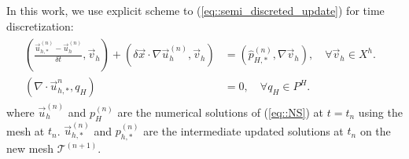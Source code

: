 \documentclass{eajam}
\begin{document}
\begin{enumerate}[step 1]
       In this work, we use explicit scheme to
       (\ref{eq::semi_discreted_update}) for time discretization:
       \begin{eqnarray}
         \begin{aligned}
           \left ( \frac{\vec{u}_{h, *}^{(n)} - \vec{u}_h^{(n)}}{\delta
               t},
           \vec{v}_h \right) + \left( \delta \vec{x} \cdot \nabla 
           \vec{u}_{h}^{(n)}, \vec{v}_h \right)  & =  \left( 
           \hat{p}_{H, *}^{(n)}, \nabla \vec{v}_h \right),  \quad
           \forall \vec{v}_h \in X^h. &\\
           \left( \nabla \cdot \vec{u}_{h, *}^{n}, q_H \right) & =  0, \quad
           \forall q_H \in P^H. &
         \end{aligned}
         \label{eq::full_discreted_update}
       \end{eqnarray}
       where $\vec{u}_h^{(n)}$ and $p_H^{(n)}$ are the numerical
       solutions of (\ref{eq::NS}) at $t = t_{n}$ using the mesh at
       $t_n$. $\vec{u}_{h,*}^{(n)}$ and $p_{h, *}^{(n)}$ are the
       intermediate updated solutions at $t_{n}$ on the new
       mesh $\mathcal{T}^{(n + 1)}$. 
     \end{enumerate}  
\end{document}
